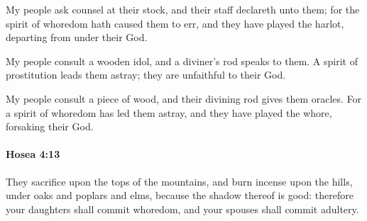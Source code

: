 			\begin{versebox}
					\item[BHS] 
					\item[LXX] 
					\item[ASV] My people ask counsel at their stock, and their staff declareth unto them; for the spirit of whoredom hath caused them to err, and they have played the harlot, departing from under their God.
					\item[NIV] My people consult a wooden idol, and a diviner’s rod speaks to them. A spirit of prostitution leads them astray; they are unfaithful to their God.
					\item[NRSV] My people consult a piece of wood, and their divining rod gives them oracles. For a spirit of whoredom has led them astray, and they have played the whore, forsaking their God.
			\end{versebox}

		\paragraph{Hosea 4:13} %
			\label{HOSEA-4-13}

			They sacrifice upon the tops of the mountains, and burn incense upon the hills, under oaks and poplars and elms, because the shadow thereof is good: therefore your daughters shall commit whoredom, and your spouses shall commit adultery.

